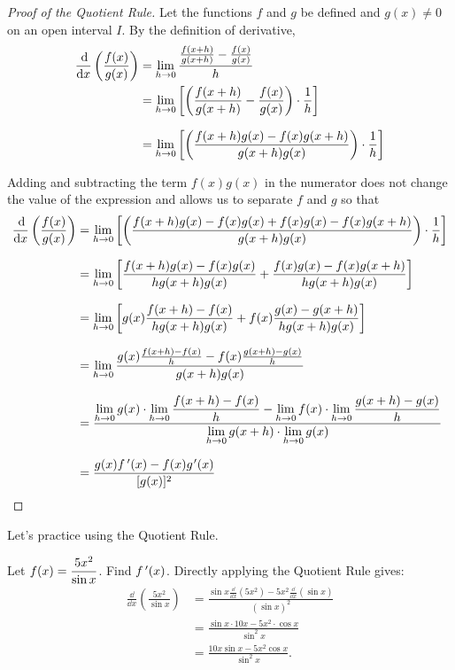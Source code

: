 \begin{proof}[Proof of the Quotient Rule]
Let the functions $f$ and $g$ be defined and $g(x) \neq 0$ on an open interval $I$. By the definition of derivative,
\begin{align*}
\frac{\operatorname{d}\!}{\operatorname{d}\! x}\left(\frac {f(x)}{g(x)}\right)
&=\lim_{h\to 0}\frac{\frac{f(x+h)}{g(x+h)}-\frac{f(x)}{g(x)}}{h} \\
&=\lim_{h\to 0}
\left[\left(\frac{f(x+h)}{g(x+h)}-\frac{f(x)}{g(x)}\right)\cdot\frac1h\right]\\[.5\baselineskip]
&=\lim_{h\to 0}
\left[\left(\frac{f(x+h)g(x)-f(x)g(x+h)}{g(x+h)g(x)}\right)\cdot\frac1h\right]
\end{align*}

Adding and subtracting the term $f(x)g(x)$ in the numerator does not change the value of the expression and allows us to separate $f$ and $g$ so that
{\small\allowdisplaybreaks
\begin{align*}
\frac{\dd}{\dd x}\left(\frac{f(x)}{g(x)}\right)
&=\lim_{h\to 0}\left[\left(\frac{f(x+h)g(x)-f(x)g(x)+f(x)g(x)-f(x)g(x+h)}{g(x+h)g(x)}\right)\cdot\frac1h\right] \\[.5\baselineskip]
&=\lim_{h\to 0}\left[\frac{f(x+h)g(x)-f(x)g(x)}{hg(x+h)g(x)}+\frac{f(x)g(x)-f(x)g(x+h)}{hg(x+h)g(x)}\right] \\[.5\baselineskip]
&=\lim_{h\to 0}\left[g(x)\frac{f(x+h)-f(x)}{hg(x+h)g(x)}+f(x)\frac{g(x)-g(x+h)}{hg(x+h)g(x)}\right] \\[.5\baselineskip]
&=\lim_{h\to 0}\frac{g(x)\frac{f(x+h)-f(x)}{h}-f(x)\frac{g(x+h)-g(x)}{h}}{g(x+h)g(x)} \\[.5\baselineskip]
&=\frac{\ds\lim_{h\to 0}g(x)\cdot\lim_{h\to 0}\frac{f(x+h)-f(x)}{h}-\lim_{h\to 0}f(x) \cdot\lim_{h\to 0}\frac{g(x+h) - g(x)}{h}}{\ds\lim_{h\to 0}g(x+h)\cdot\lim_{h\to 0}g(x)} \\[.5\baselineskip]
&=\frac{g(x)\fp(x)-f(x)g\primeskip'(x)}{[g(x)]^2}\qedhere
\end{align*}}
\end{proof}

Let's practice using the Quotient Rule.

\begin{example}\label{ex_quot1}%
Let $\displaystyle f(x) = \frac{5x^2}{\sin x}$. Find $f\,'(x)$.
\solution
Directly applying the Quotient Rule gives:
\begin{align*}
	\frac{\dd}{\dd x}\left(\frac{5x^2}{\sin x}\right)
	& = \frac{\sin x\frac{\dd}{\dd x}(5x^2)-5x^2\frac{\dd}{\dd x}(\sin x)}{(\sin x)^2} \\
	&= \frac{\sin x\cdot 10x - 5x^2\cdot \cos x}{\sin^2x} \\
	&= \frac{10x\sin x - 5x^2\cos x}{\sin^2 x}.
\end{align*}
\end{example}

